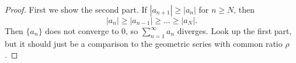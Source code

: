 \begin{proof}
  First we show the second part. If
  $|a_{n + 1}| \ge |a_n|$ for $n \ge N$, then
  \[|a_n| \ge |a_{n - 1}| \ge \dots \ge |a_N|.\]
  Then $\{a_n\}$ does not converge to $0$, so
  $\sum_{n = 1}^\infty a_n$ diverges.
  Look up the first part, but it should just be a
  comparison to the geometric series with common ratio
  $\rho$.
\end{proof}
